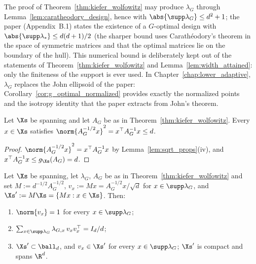 \begin{remark}\label{rem:design_kw_support}
The proof of Theorem~\ref{thm:kiefer_wolfowitz} may produce $\lambda_G$ through
Lemma~\ref{lem:caratheodory_design}, hence with $\abs{\supp\lambda_G} \le d^2 + 1$; the
paper (Appendix~B.1) states the existence of a $G$-optimal design with
$\abs{\supp\lambda_*} \le d(d+1)/2$ (the sharper bound uses Carath\'eodory's theorem in the
space of symmetric matrices and that the optimal matrices lie on the boundary of the hull). This
numerical bound is deliberately kept out of the statements of
Theorem~\ref{thm:kiefer_wolfowitz} and Lemma~\ref{lem:width_attained}: only the finiteness of
the support is ever used. In
Chapter~\ref{chap:lower_adaptive}, $\lambda_G$ replaces the John ellipsoid of the paper:
Corollary~\ref{cor:g_optimal_normalized} provides exactly the normalized points and the isotropy
identity that the paper extracts from John's theorem.
\end{remark}

\begin{corollary}\label{cor:g_optimal_norm_bound}
\leanok
{}
Let $\Xs$ be spanning and let $A_G$ be as in Theorem~\ref{thm:kiefer_wolfowitz}. Every $x \in \Xs$ satisfies
$\norm{A_G^{-1/2}x}^2 = x^\top A_G^{-1}x \le d$.
\end{corollary}

\begin{proof}
\leanok
{}
$\norm{A_G^{-1/2}x}^2 = x^\top A_G^{-1}x$ by Lemma~\ref{lem:sqrt_props}(iv), and
$x^\top A_G^{-1} x \le g_{\Xs}(A_G) = d$.
\end{proof}

\begin{corollary}\label{cor:g_optimal_normalized}
\leanok
{}
Let $\Xs$ be spanning, let $\lambda_G$, $A_G$ be as in Theorem~\ref{thm:kiefer_wolfowitz} and set $M := d^{-1/2}A_G^{-1/2}$,
$v_x := Mx = A_G^{-1/2}x/\sqrt d$ for $x \in \supp\lambda_G$, and
$\Xs' := M\Xs = \{Mx : x \in \Xs\}$. Then:
\begin{enumerate}
  \item[(i)] $\norm{v_x} = 1$ for every $x \in \supp\lambda_G$;
  \item[(ii)] $\sum_{x \in \supp\lambda_G}\lambda_{G,x}\, v_xv_x^\top = I_d/d$;
  \item[(iii)] $\Xs' \subset \ball_d$, and $v_x \in \Xs'$ for every $x \in \supp\lambda_G$;
        $\Xs'$ is compact and spans $\R^d$.
\end{enumerate}
\end{corollary}

